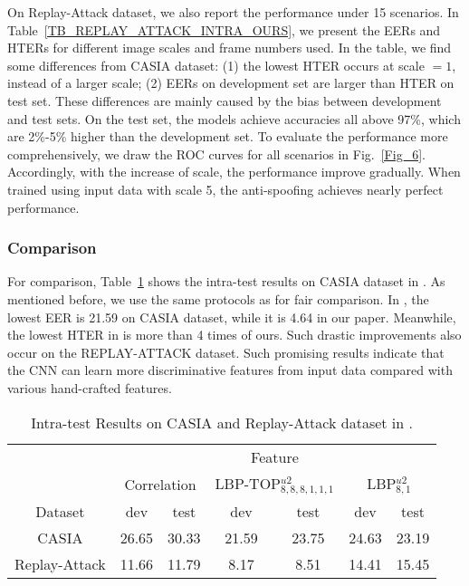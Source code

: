 \documentclass[letterpaper, 10 pt, conference]{ieeeconf}
\begin{document}
On Replay-Attack dataset, we also report the performance under 15 scenarios. In Table~\ref{TB_REPLAY_ATTACK_INTRA_OURS}, we present the EERs and HTERs for different image scales and frame numbers used. In the table, we find some differences from CASIA dataset: (1) the lowest HTER occurs at scale $=1$, instead of a larger scale; (2) EERs on development set are larger than HTER on test set. These differences are mainly caused by the bias between development and test sets. On the test set, the models achieve accuracies all above 97\%, which are 2\%-5\% higher than the development set. To evaluate the performance more comprehensively, we draw the ROC curves for all scenarios in Fig.~\ref{Fig_6}. Accordingly, with the increase of scale, the performance improve gradually. When trained using input data with scale 5, the anti-spoofing achieves nearly perfect performance.

\subsubsection{Comparison}

For comparison, Table~\ref{TB_CASIA_INTRA_PREVIOUS} shows the intra-test results on CASIA dataset in \cite{Face_Anti_Spoofing_Pereira_2013}. As mentioned before, we use the same protocols as \cite{Face_Anti_Spoofing_Pereira_2013} for fair comparison. In \cite{Face_Anti_Spoofing_Pereira_2013}, the lowest EER is 21.59 on CASIA dataset, while it is 4.64 in our paper. Meanwhile, the lowest HTER in \cite{Face_Anti_Spoofing_Pereira_2013} is more than 4 times of ours. Such drastic improvements also occur on the REPLAY-ATTACK dataset. Such promising results indicate that the CNN can learn more discriminative features from input data compared with various hand-crafted features.

\begin{table}[!htb]
\caption{Intra-test Results on CASIA and Replay-Attack dataset in \cite{Face_Anti_Spoofing_Pereira_2013}.}
\label{TB_CASIA_INTRA_PREVIOUS}
\centering
\begin{tabular}{|c|c|c|c|c|c|c|}
\cline{2-7}
 \multicolumn{1}{c|}{}      & \multicolumn{6}{c|}{Feature}     \\
       \cline{2-7}
  \multicolumn{1}{c|}{}     & \multicolumn{2}{c|}{Correlation} & \multicolumn{2}{c|}{LBP-TOP$^{u2}_{8,8,8,1,1,1}$} & \multicolumn{2}{c|}{LBP$^{u2}_{8, 1}$} \\
\hline
Dataset       & dev & test & dev & test & dev & test \\
       \hline
CASIA   & 26.65 & 30.33 & 21.59 & 23.75 & 24.63 & 23.19 \\
\hline
Replay-Attack  & 11.66 & 11.79 & 8.17 & 8.51 & 14.41 & 15.45 \\
\hline
\end{tabular}
\end{table}
\end{document}
